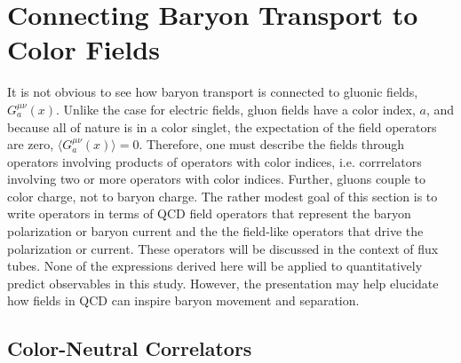 \documentclass[aps, prc, 12pt, nofootinbib, showpacs, superscriptaddress, tightenlines, groupedaddress]{revtex4-2}
\begin{document}
\section{Connecting Baryon Transport to Color Fields}

It is not obvious to see how baryon transport is connected to gluonic fields, $G^{\mu\nu}_a(x)$. Unlike the case for electric fields, gluon fields have a color index, $a$, and because all of nature is in a color singlet, the expectation of the field operators are zero, $\langle G^{\mu\nu}_a(x)\rangle=0$. Therefore, one must describe the fields through operators involving products of operators with color indices, i.e. corrrelators involving two or more operators with color indices. Further, gluons couple to color charge, not to baryon charge. The rather modest goal of this section is to write operators in terms of QCD field operators that represent the baryon polarization or baryon current and the the field-like operators that drive the polarization or current. These operators will be discussed in the context of flux tubes. None of the expressions derived here will be applied to quantitatively predict observables in this study. However, the presentation may help elucidate how fields in QCD can inspire baryon movement and separation.

\subsection{Color-Neutral Correlators}
\end{document}
